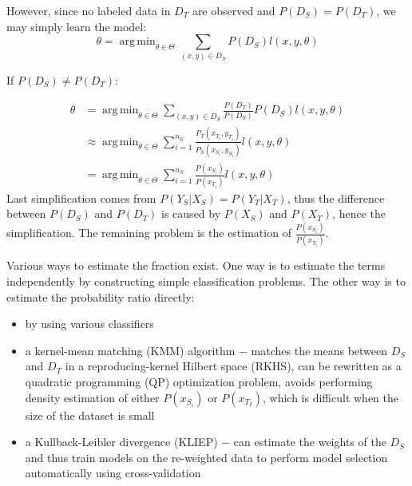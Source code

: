 \documentclass[a4paper,twocolumn]{article}
\DeclareMathOperator*{\argmin}{arg\,min}
\begin{document}
However, since no labeled data in $D_T$ are observed and $P(D_S) = P(D_T)$, we may simply learn the model:
\begin{equation}
    \theta = \argmin_{\theta \in \Theta} \sum_{(x,y) \in D_S} P(D_S)l(x, y, \theta)
\end{equation}

If $P(D_S) \ne P(D_T)$:

\begin{align}
    \theta &= \argmin_{\theta \in \Theta} \sum_{(x,y) \in D_S} \frac{P(D_T)}{P(D_S)}P(D_S)l(x, y, \theta) \\
           &\approx \argmin_{\theta \in \Theta} \sum_{i = 1}^{n_S} \frac{P_T(x_{T_i}, y_{T_i})}{P_S(x_{S_i}, y_{S_i})}l(x, y, \theta) \\
           &= \argmin_{\theta \in \Theta} \sum_{i = 1}^{n_S} \frac{P(x_{S_i})}{P(x_{T_i})}l(x, y, \theta)
\end{align}
Last simplification comes from $P(Y_S|X_S) = P(Y_T|X_T)$, thus the difference between $P(D_S)$ and $P(D_T)$ is caused by $P(X_S)$ and $P(X_T)$, hence the simplification. The remaining problem is the estimation of $\frac{P(x_{S_i})}{P(x_{T_i})}$.

Various ways to estimate the fraction exist. One way is to estimate the terms independently by constructing simple classification problems. The other way is to estimate the probability ratio directly:
\begin{itemize}
    \item by using various classifiers
    \item a kernel-mean matching (KMM) algorithm $-$ matches the means between $D_S$ and $D_T$ in a reproducing-kernel Hilbert space (RKHS), can be rewritten as a quadratic programming (QP) optimization problem, avoids performing density estimation of either $P(x_{S_i})$ or $P(x_{T_I})$, which is difficult when the size of the dataset is small
    \item a Kullback-Leibler divergence (KLIEP) $-$ can estimate the weights of the $D_S$ and thus train models on the re-weighted data to perform model selection automatically using cross-validation
\end{itemize}
\end{document}
